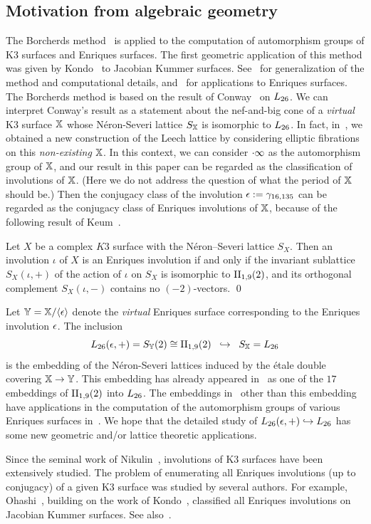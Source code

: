 \documentclass{amsart} %
\begin{document}
\subsection{Motivation from algebraic geometry}\label{subsec:alggeom}
%
The Borcherds method~\cite{MR913200, MR1654763}
is applied to the computation of automorphism groups of K3 surfaces and Enriques surfaces.
The first geometric application of this method was given 
by Kondo~\cite{MR1618132} to Jacobian Kummer surfaces.
See~\cite{MR3456710, MR4759604} for generalization of the method and computational details,
and~\cite{MR4498439, MR4389670} for applications to Enriques surfaces.
The Borcherds method is based on the result of Conway~\cite{MR690711} on $L_{26}$. 
We can interpret Conway's result 
as a statement about the nef-and-big cone of a \emph{virtual} K3 surface $\mathord{\mathbb{X}}$
 whose N\'eron-Severi lattice $S_{\mathord{\mathbb{X}}}$ is isomorphic to $L_{26}$.
 In fact,
in~\cite{MR4674939}, 
we obtained a new construction of the Leech lattice
by considering elliptic fibrations on this \emph{non-existing} $\mathord{\mathbb{X}}$.
In this context, we can consider $\cdot \infty$ as 
the automorphism group of $\mathord{\mathbb{X}}$,
and our result in this paper can be regarded as the classification of involutions of $\mathord{\mathbb{X}}$.
(Here we do not address the question of what the period of $\mathord{\mathbb{X}}$ should be.)
Then 
the conjugacy class of the involution $\epsilon:=\gamma_{16, 135}$ can be regarded 
 as the conjugacy class of Enriques involutions of $\mathord{\mathbb{X}}$,
 because of the following result of Keum~\cite{MR1060704}.
 \begin{proposition}
 Let $X$ be a complex $K3$ surface
with the N\'eron--Severi lattice $S_X$.
 Then an involution $\iota$ of $X$ is an Enriques involution
 if and only if the invariant sublattice $S_X(\iota, +)$ of 
 the action of $\iota$ on $S_X$ 
 is isomorphic to $\mathrm{II}_{1,9} (2)$,
 and its orthogonal complement $S_X(\iota, -)$
contains no $(-2)$-vectors.
 \qed
 \end{proposition}
%
Let $\mathord{\mathbb{Y}}=\mathord{\mathbb{X}}/\langle {\epsilon} \rangle$ denote the \emph{virtual} Enriques surface
corresponding to the Enriques involution $\epsilon$.
The inclusion 
\[
L_{26}(\epsilon, +)=S_{\mathord{\mathbb{Y}}}(2)\cong \mathrm{II}_{1,9} (2)\;\; \hookrightarrow \;\;S_{\mathord{\mathbb{X}}}=L_{26}
\]
is the embedding of the N\'eron-Severi lattices
induced by the \'etale double covering $\mathord{\mathbb{X}}\to \mathord{\mathbb{Y}}$.
This embedding 
has already appeared in~\cite{MR4389670} as one of the $17$ embeddings 
of $\mathrm{II}_{1,9} (2)$ into $L_{26}$.
The embeddings in~\cite{MR4389670} other than this embedding 
have applications in the computation of the automorphism groups
of various Enriques surfaces in~\cite{MR4498439}.
We hope that the detailed study of $L_{26}(\epsilon, +)\hookrightarrow L_{26}$
has some new geometric and/or lattice theoretic applications.
%
\par
Since the seminal work of Nikulin~\cite{MR633160}, 
involutions of K3 surfaces have been extensively studied.
The problem of enumerating all Enriques involutions 
(up to conjugacy) of a given K3 surface was
studied by several authors.
For example, Ohashi~\cite{MR2552959},
building on the work of Kondo~\cite{MR1618132}, 
 classified all Enriques involutions on Jacobian Kummer surfaces. 
 See also~\cite{MR4288644}.
%
%
\end{document}
